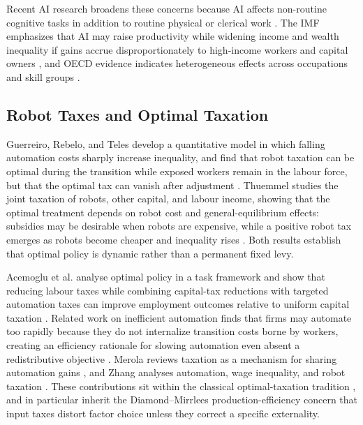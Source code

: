 \documentclass[journal]{IEEEtran}
\theoremstyle{plain}
\theoremstyle{definition}
\begin{document}
Recent AI research broadens these concerns because AI affects non-routine cognitive tasks in addition to routine physical or clerical work \cite{FreyOsborne2017,BrynjolfssonMitchellRock2018,Eloundou2023}. The IMF emphasizes that AI may raise productivity while widening income and wealth inequality if gains accrue disproportionately to high-income workers and capital owners \cite{IMF2024AI}, and OECD evidence indicates heterogeneous effects across occupations and skill groups \cite{OECD2025Korea}.

\subsection{Robot Taxes and Optimal Taxation}

Guerreiro, Rebelo, and Teles develop a quantitative model in which falling automation costs sharply increase inequality, and find that robot taxation can be optimal during the transition while exposed workers remain in the labour force, but that the optimal tax can vanish after adjustment \cite{Guerreiro2022}. Thuemmel studies the joint taxation of robots, other capital, and labour income, showing that the optimal treatment depends on robot cost and general-equilibrium effects: subsidies may be desirable when robots are expensive, while a positive robot tax emerges as robots become cheaper and inequality rises \cite{Thuemmel2023}. Both results establish that optimal policy is dynamic rather than a permanent fixed levy.

Acemoglu et al. analyse optimal policy in a task framework and show that reducing labour taxes while combining capital-tax reductions with targeted automation taxes can improve employment outcomes relative to uniform capital taxation \cite{AcemogluOptimalPolicy}. Related work on inefficient automation finds that firms may automate too rapidly because they do not internalize transition costs borne by workers, creating an efficiency rationale for slowing automation even absent a redistributive objective \cite{InefficientAutomation}. Merola reviews taxation as a mechanism for sharing automation gains \cite{Merola2022}, and Zhang analyses automation, wage inequality, and robot taxation \cite{Zhang2019}. These contributions sit within the classical optimal-taxation tradition \cite{MirrleesOptimal1971,DiamondMirrlees1971,AtkinsonStiglitz1976}, and in particular inherit the Diamond--Mirrlees production-efficiency concern that input taxes distort factor choice unless they correct a specific externality.
\end{document}
